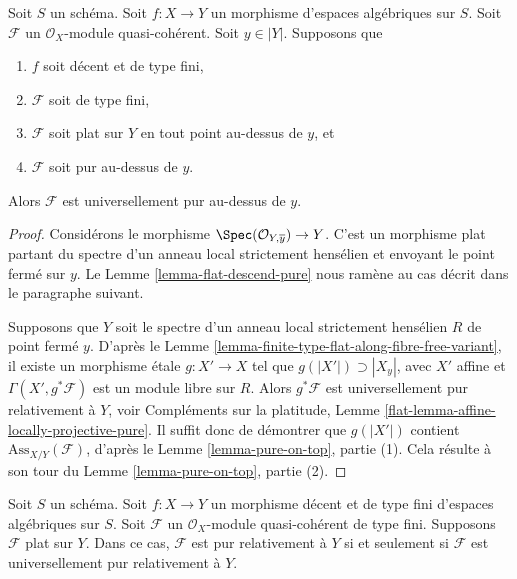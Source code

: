 \begin{lemma}
\label{lemma-finite-type-flat-pure-along-fibre-is-universal}
Soit $S$ un schéma. Soit $f : X \to Y$ un morphisme d'espaces
algébriques sur $S$.
Soit $\mathcal{F}$ un $\mathcal{O}_X$-module quasi-cohérent.
Soit $y \in |Y|$.
Supposons que
\begin{enumerate}
\item $f$ soit décent et de type fini,
\item $\mathcal{F}$ soit de type fini,
\item $\mathcal{F}$ soit plat sur $Y$ en tout point au-dessus de $y$, et
\item $\mathcal{F}$ soit pur au-dessus de $y$.
\end{enumerate}
Alors $\mathcal{F}$ est universellement pur au-dessus de $y$.
\end{lemma}

\begin{proof}
Considérons le morphisme $\Spec(\mathcal{O}_{Y, \overline{y}}) \to Y$.
C'est un morphisme plat partant du spectre d'un anneau local
strictement hensélien et envoyant le point fermé sur $y$.
Le Lemme \ref{lemma-flat-descend-pure} nous ramène au cas
décrit dans le paragraphe suivant.

\medskip\noindent
Supposons que $Y$ soit le spectre d'un anneau local strictement hensélien $R$
de point fermé $y$.
D'après le Lemme \ref{lemma-finite-type-flat-along-fibre-free-variant},
il existe un morphisme \'etale $g : X' \to X$ tel que
$g(|X'|) \supset |X_y|$, avec $X'$ affine et
$\Gamma(X', g^*\mathcal{F})$ est un module libre sur $R$.
Alors $g^*\mathcal{F}$ est universellement pur relativement à $Y$, voir
Compléments sur la platitude, Lemme \ref{flat-lemma-affine-locally-projective-pure}.
Il suffit donc de démontrer que
$g(|X'|)$ contient $\text{Ass}_{X/Y}(\mathcal{F})$,
d'après le Lemme \ref{lemma-pure-on-top}, partie (1).
Cela résulte à son tour du
Lemme \ref{lemma-pure-on-top}, partie (2).
\end{proof}

\begin{lemma}
\label{lemma-finite-type-flat-pure-is-universal}
Soit $S$ un schéma.
Soit $f : X \to Y$ un morphisme décent et de type fini d'espaces
algébriques sur $S$.
Soit $\mathcal{F}$ un $\mathcal{O}_X$-module quasi-cohérent de type fini.
Supposons $\mathcal{F}$ plat sur $Y$. Dans ce cas,
$\mathcal{F}$ est pur relativement à $Y$ si et seulement si $\mathcal{F}$
est universellement pur relativement à $Y$.
\end{lemma}

